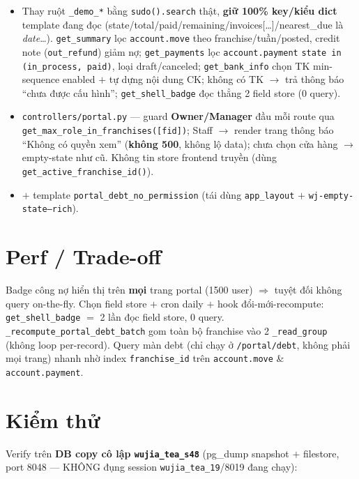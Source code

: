 \begin{itemize}
  \item Thay ruột \texttt{\_demo\_*} bằng \texttt{sudo().search} thật, \textbf{giữ 100\% key/kiểu
    dict} template đang đọc (state/total/paid/remaining/invoices[\ldots]/nearest\_due là
    \emph{date}\ldots). \texttt{get\_summary} lọc \texttt{account.move} theo
    franchise/tuần/posted, credit note (\texttt{out\_refund}) giảm nợ; \texttt{get\_payments}
    lọc \texttt{account.payment} \texttt{state in (in\_process, paid)}, loại draft/canceled;
    \texttt{get\_bank\_info} chọn TK min-sequence enabled $+$ tự dựng nội dung CK; không có TK
    $\to$ trả thông báo ``chưa được cấu hình''; \texttt{get\_shell\_badge} đọc thẳng 2 field
    store (0 query).
  \item \texttt{controllers/portal.py} --- guard \textbf{Owner/Manager} đầu mỗi route qua
    \texttt{get\_max\_role\_in\_franchises([fid])}; Staff $\to$ render trang thông báo ``Không
    có quyền xem'' (\textbf{không 500}, không lộ data); chưa chọn cửa hàng $\to$ empty-state như
    cũ. Không tin store frontend truyền (dùng \texttt{get\_active\_franchise\_id()}).
  \item $+$ template \texttt{portal\_debt\_no\_permission} (tái dùng \texttt{app\_layout} $+$
    \texttt{wj-empty-state--rich}).
\end{itemize}

\section{Perf / Trade-off}

Badge công nợ hiển thị trên \textbf{mọi} trang portal (1500 user) $\Rightarrow$ tuyệt đối không
query on-the-fly. Chọn field store $+$ cron daily $+$ hook đổi-mới-recompute: \texttt{get\_shell\_badge}
$=$ 2 lần đọc field store, 0 query. \texttt{\_recompute\_portal\_debt\_batch} gom toàn bộ
franchise vào 2 \texttt{\_read\_group} (không loop per-record). Query màn debt (chỉ chạy ở
\texttt{/portal/debt}, không phải mọi trang) nhanh nhờ index \texttt{franchise\_id} trên
\texttt{account.move} \& \texttt{account.payment}.

\section{Kiểm thử}

Verify trên \textbf{DB copy cô lập \texttt{wujia\_tea\_s48}} (pg\_dump snapshot $+$ filestore,
port 8048 --- KHÔNG đụng session \texttt{wujia\_tea\_19}/8019 đang chạy):

